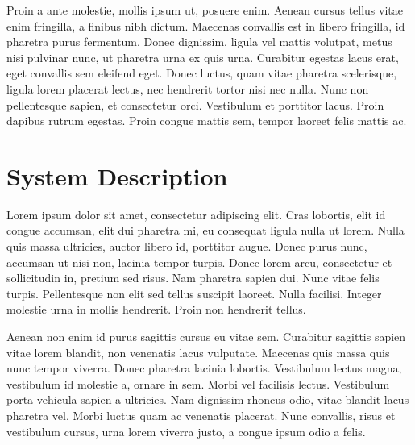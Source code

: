 \documentclass[a4paper]{article}
\begin{document}
Proin a ante molestie, mollis ipsum ut, posuere enim. Aenean cursus tellus vitae enim fringilla, a finibus nibh dictum. Maecenas convallis est in libero fringilla, id pharetra purus fermentum. Donec dignissim, ligula vel mattis volutpat, metus nisi pulvinar nunc, ut pharetra urna ex quis urna. Curabitur egestas lacus erat, eget convallis sem eleifend eget. Donec luctus, quam vitae pharetra scelerisque, ligula lorem placerat lectus, nec hendrerit tortor nisi nec nulla. Nunc non pellentesque sapien, et consectetur orci. Vestibulum et porttitor lacus. Proin dapibus rutrum egestas. Proin congue mattis sem, tempor laoreet felis mattis ac.


\section{System Description}


Lorem ipsum dolor sit amet, consectetur adipiscing elit. Cras lobortis, elit id congue accumsan, elit dui pharetra mi, eu consequat ligula nulla ut lorem. Nulla quis massa ultricies, auctor libero id, porttitor augue. Donec purus nunc, accumsan ut nisi non, lacinia tempor turpis. Donec lorem arcu, consectetur et sollicitudin in, pretium sed risus. Nam pharetra sapien dui. Nunc vitae felis turpis. Pellentesque non elit sed tellus suscipit laoreet. Nulla facilisi. Integer molestie urna in mollis hendrerit. Proin non hendrerit tellus.

Aenean non enim id purus sagittis cursus eu vitae sem. Curabitur sagittis sapien vitae lorem blandit, non venenatis lacus vulputate. Maecenas quis massa quis nunc tempor viverra. Donec pharetra lacinia lobortis. Vestibulum lectus magna, vestibulum id molestie a, ornare in sem. Morbi vel facilisis lectus. Vestibulum porta vehicula sapien a ultricies. Nam dignissim rhoncus odio, vitae blandit lacus pharetra vel. Morbi luctus quam ac venenatis placerat. Nunc convallis, risus et vestibulum cursus, urna lorem viverra justo, a congue ipsum odio a felis.
\end{document}
